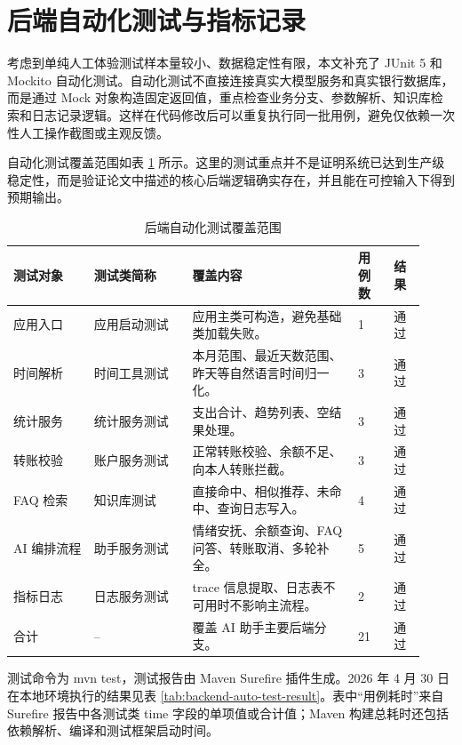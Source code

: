 \documentclass[bachelor, print]{xduthesis}
\begin{document}
\section{后端自动化测试与指标记录}

考虑到单纯人工体验测试样本量较小、数据稳定性有限，本文补充了 JUnit 5 和 Mockito 自动化测试。自动化测试不直接连接真实大模型服务和真实银行数据库，而是通过 Mock 对象构造固定返回值，重点检查业务分支、参数解析、知识库检索和日志记录逻辑。这样在代码修改后可以重复执行同一批用例，避免仅依赖一次性人工操作截图或主观反馈。

自动化测试覆盖范围如表 \ref{tab:backend-auto-test-scope} 所示。这里的测试重点并不是证明系统已达到生产级稳定性，而是验证论文中描述的核心后端逻辑确实存在，并且能在可控输入下得到预期输出。

\begin{table}[H]
    \centering
    \caption{后端自动化测试覆盖范围}
    \label{tab:backend-auto-test-scope}
    \small
    \setlength{\tabcolsep}{3pt}
    \begin{tabular}{|p{0.18\linewidth}|p{0.22\linewidth}|p{0.37\linewidth}|p{0.08\linewidth}|p{0.07\linewidth}|}
        \hline
        测试对象 & 测试类简称 & 覆盖内容 & 用例数 & 结果 \\
        \hline
        应用入口 & 应用启动测试 & 应用主类可构造，避免基础类加载失败。 & 1 & 通过 \\
        \hline
        时间解析 & 时间工具测试 & 本月范围、最近天数范围、昨天等自然语言时间归一化。 & 3 & 通过 \\
        \hline
        统计服务 & 统计服务测试 & 支出合计、趋势列表、空结果处理。 & 3 & 通过 \\
        \hline
        转账校验 & 账户服务测试 & 正常转账校验、余额不足、向本人转账拦截。 & 3 & 通过 \\
        \hline
        FAQ 检索 & 知识库测试 & 直接命中、相似推荐、未命中、查询日志写入。 & 4 & 通过 \\
        \hline
        AI 编排流程 & 助手服务测试 & 情绪安抚、余额查询、FAQ 问答、转账取消、多轮补全。 & 5 & 通过 \\
        \hline
        指标日志 & 日志服务测试 & trace 信息提取、日志表不可用时不影响主流程。 & 2 & 通过 \\
        \hline
        合计 & -- & 覆盖 AI 助手主要后端分支。 & 21 & 通过 \\
        \hline
    \end{tabular}
\end{table}

测试命令为 mvn test，测试报告由 Maven Surefire 插件生成。2026 年 4 月 30 日在本地环境执行的结果见表 \ref{tab:backend-auto-test-result}。表中“用例耗时”来自 Surefire 报告中各测试类 time 字段的单项值或合计值；Maven 构建总耗时还包括依赖解析、编译和测试框架启动时间。
\end{document}
